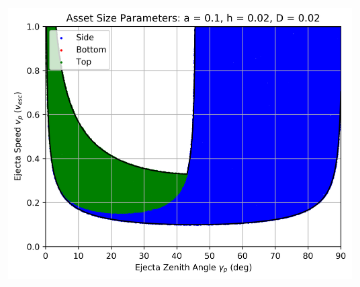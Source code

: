 \documentclass{article}
\begin{document}
\begin{figure}
	\begin{subfigure}[t]{.32\textwidth}
		\centering
		\includegraphics[width=.98\linewidth]{asset_speed_zenith_plot_1.000e-01_2.000e-02_2.000e-02.png}  
		\label{fig:sub-asset_speed_zenith_6}
	\end{subfigure}
	

\end{figure}
\end{document}
